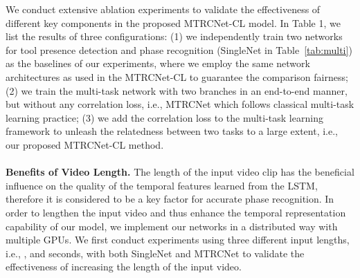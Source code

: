 \documentclass{elsarticle}
\begin{document}
We conduct extensive ablation experiments to validate the effectiveness of different key components in the proposed MTRCNet-CL model.
In Table 1, we list the results of three configurations:
(1) we independently train two networks for tool presence detection and phase recognition (SingleNet in Table~\ref{tab:multi}) as the baselines of our experiments,
where we employ the same network architectures as used in the MTRCNet-CL to guarantee the comparison fairness;
(2) we train the multi-task network with two branches in an end-to-end manner, but without any correlation loss, i.e., MTRCNet which follows classical multi-task learning practice;
(3) we add the correlation loss to the multi-task learning framework to unleash the relatedness between two tasks to a large extent, i.e., our proposed MTRCNet-CL method.
\\
\\
\textbf{Benefits of Video Length.}
The length of the input video clip has the beneficial influence on the quality of the temporal features learned from the LSTM, therefore it is considered to be a key factor for accurate phase recognition.
In order to lengthen the input video and thus enhance the temporal representation capability of our model, we implement our networks in a distributed way with multiple GPUs.
We first conduct experiments using three different input lengths, i.e., ,  and  seconds, with both SingleNet and MTRCNet to validate the effectiveness of increasing the length of the input video.
\end{document}
